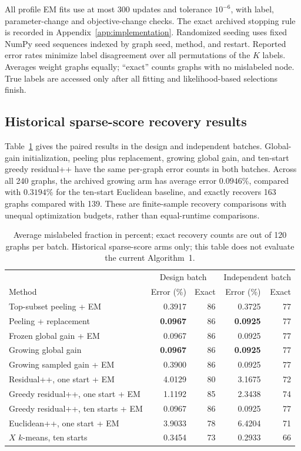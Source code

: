All profile EM fits use at most 300 updates and tolerance $10^{-6}$, with label, parameter-change and objective-change checks. The exact archived stopping rule is recorded in Appendix~\ref{app:implementation}.
Randomized seeding uses fixed NumPy seed sequences indexed by graph seed,
method, and restart. Reported error rates minimize label disagreement over
all permutations of the $K$ labels. Averages weight graphs equally; ``exact''
counts graphs with no mislabeled node. True labels are accessed only after
all fitting and likelihood-based selections finish.

\subsection{Historical sparse-score recovery results}

Table~\ref{tab:experiment_summary} gives the paired results in the design and
independent batches. Global-gain initialization, peeling plus replacement,
growing global gain, and ten-start greedy residual++ have the same per-graph
error counts in both batches. Across all 240 graphs, the archived growing
arm has average error $0.0946\%$, compared with $0.3194\%$ for the ten-start
Euclidean baseline, and exactly recovers 163 graphs compared with 139.
These are finite-sample recovery comparisons with unequal optimization
budgets, rather than equal-runtime comparisons.

\begin{table}[tb]
\centering
\small
\caption{Average mislabeled fraction in percent; exact recovery counts are
out of 120 graphs per batch. Historical sparse-score arms only; this table does not evaluate the current Algorithm~1.}
\label{tab:experiment_summary}
\begin{tabular}{lrrrr}
\toprule
&\multicolumn{2}{c}{Design batch}&\multicolumn{2}{c}{Independent batch}\\
Method&Error (\%)&Exact&Error (\%)&Exact\\
\midrule
Top-subset peeling + EM&0.3917&86&0.3725&77\\
Peeling + replacement&\textbf{0.0967}&86&\textbf{0.0925}&77\\
Frozen global gain + EM&0.0967&86&0.0925&77\\
Growing global gain&\textbf{0.0967}&86&\textbf{0.0925}&77\\
Growing sampled gain + EM&0.3900&86&0.0925&77\\
Residual++, one start + EM&4.0129&80&3.1675&72\\
Greedy residual++, one start + EM&1.1192&85&2.3438&74\\
Greedy residual++, ten starts + EM&0.0967&86&0.0925&77\\
Euclidean++, one start + EM&3.9033&78&6.4204&71\\
$X$ $k$-means, ten starts&0.3454&73&0.2933&66\\
\bottomrule
\end{tabular}
\end{table}

